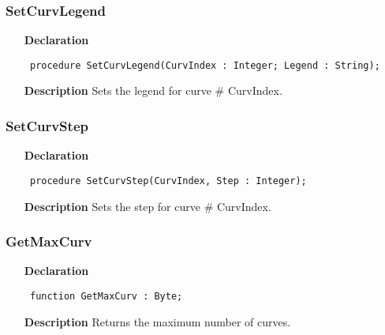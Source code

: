 \documentclass[12pt,a4paper,oneside]{report}
\newcommand{\declarationitem}[1]{\textbf{#1}}
\newcommand{\descriptiontitle}[1]{\textbf{#1}}
\newcommand{\code}[1]{\texttt{#1}}
\begin{document}
\subsubsection{SetCurvLegend}
\label{uplot-SetCurvLegend}
\begin{itemize}\item[\declarationitem{Declaration}\hfill]
	\begin{flushleft}
		\code{
			procedure SetCurvLegend(CurvIndex : Integer; Legend : String);}
		
	\end{flushleft}
	
	\par
	\item[\descriptiontitle{Description}]
	Sets the legend for curve {\#} CurvIndex.
	
\end{itemize}
\subsubsection{SetCurvStep}
\label{uplot-SetCurvStep}
\begin{itemize}\item[\declarationitem{Declaration}\hfill]
	\begin{flushleft}
		\code{
			procedure SetCurvStep(CurvIndex, Step : Integer);}
		
	\end{flushleft}
	
	\par
	\item[\descriptiontitle{Description}]
	Sets the step for curve {\#} CurvIndex.
	
\end{itemize}
\subsubsection{GetMaxCurv}
\label{uplot-GetMaxCurv}
\begin{itemize}\item[\declarationitem{Declaration}\hfill]
	\begin{flushleft}
		\code{
			function GetMaxCurv : Byte;}
		
	\end{flushleft}
	
	\par
	\item[\descriptiontitle{Description}]
	Returns the maximum number of curves.
	
\end{itemize}
\end{document}
